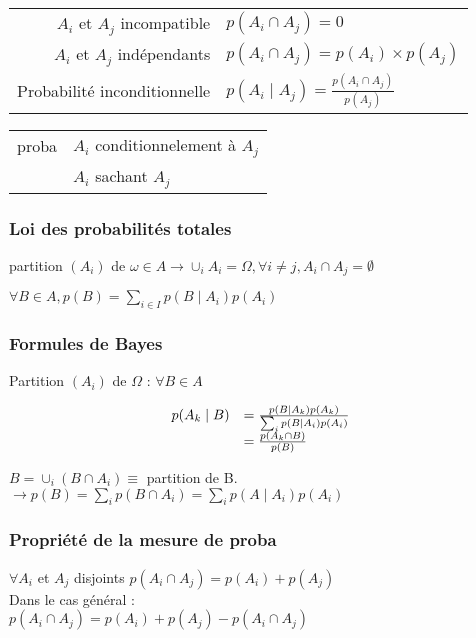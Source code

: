 \documentclass[]{article}
\begin{document}
\begin{tabular}{r l}
$A_i$ et $A_j$ incompatible & $p(A_i \cap A_j) = 0$ \\
$A_i$ et $A_j$ indépendants & $p(A_i \cap A_j) = p(A_i)\times p(A_j)$ \\
Probabilité inconditionnelle & $p(A_i \mid A_j) = \frac{p(A_i \cap A_j)}{p(A_j)}$ \\
\end{tabular}

\begin{tabular}{r l}
proba & $A_i$ conditionnelement à $A_j$ \\
      & $A_i$ sachant $A_j$
\end{tabular}

\subsubsection{Loi des probabilités totales}

partition $(A_i)$ de
$\omega \in A \rightarrow \cup_i A_i = \Omega, \forall i \neq j, A_i \cap A_j = \emptyset$

$\forall B \in A, p(B) = \sum\limits_{i\in I} p(B\mid A_i) p(A_i)$

\subsubsection{Formules de Bayes}

Partition $(A_i)$ de $\Omega$ : $\forall B \in A$

\begin{displaymath}
\begin{array}{r l}
p(A_k \mid B) &= \frac{p(B \mid A_k) p(A_k)}{\sum_i p(B \mid A_i ) p(A_i)} \\
              &= \frac{p(A_k \cap B)}{p(B)} \\
\end{array}
\end{displaymath}

$B = \cup_i (B \cap A_i) \equiv$ partition de
B.\\$\rightarrow p(B) = \sum_i p(B \cap A_i) = \sum_i p(A \mid A_i) p(A_i)$

\subsubsection{Propriété de la mesure de proba}

$\forall A_i$ et $A_j$ disjoints
$p(A_i \cap A_j) = p(A_i) + p(A_j)$\\Dans le cas général
:\\$p(A_i \cap A_j) = p(A_i) + p(A_j) -p(A_i \cap A_j)$
\end{document}
